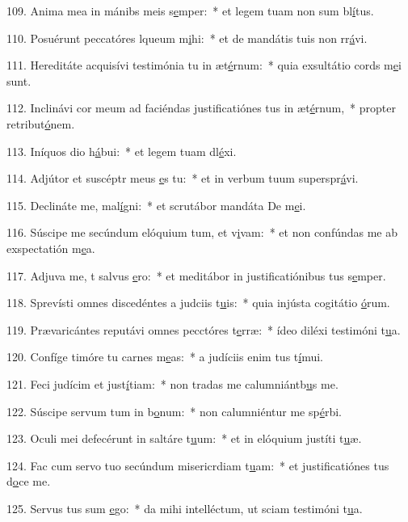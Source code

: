 109. Anima mea in mánibs meis s\uline{e}mper:~* et legem tuam non sum bl\uline{í}tus.\par 
110. Posuérunt peccatóres lqueum m\uline{i}hi:~* et de mandátis tuis non rr\uline{á}vi.\par 
111. Hereditáte acquisívi testimónia tu in æt\uline{é}rnum:~* quia exsultátio cords m\uline{e}i sunt.\par 
112. Inclinávi cor meum ad faciéndas justificatiónes tus in æt\uline{é}rnum,~* propter retribut\uline{ó}nem.\par 
113. Iníquos dio h\uline{á}bui:~* et legem tuam dl\uline{é}xi.\par 
114. Adjútor et suscéptr meus \uline{e}s tu:~* et in verbum tuum superspr\uline{á}vi.\par 
115. Declináte  me, mal\uline{í}gni:~* et scrutábor mandáta De m\uline{e}i.\par 
116. Súscipe me secúndum elóquium tum, et v\uline{i}vam:~* et non confúndas me ab exspectatión m\uline{e}a.\par 
117. Adjuva me, t salvus \uline{e}ro:~* et meditábor in justificatiónibus tus s\uline{e}mper.\par 
118. Sprevísti omnes discedéntes a judciis t\uline{u}is:~* quia injústa cogitátio \uline{ó}rum.\par 
119. Prævaricántes reputávi omnes pecctóres t\uline{e}rræ:~* ídeo diléxi testimóni t\uline{u}a.\par 
120. Confíge timóre tu carnes m\uline{e}as:~* a judíciis enim tus t\uline{í}mui.\par 
121. Feci judícim et just\uline{í}tiam:~* non tradas me calumniántb\uline{u}s me.\par 
122. Súscipe servum tum in b\uline{o}num:~* non calumniéntur me sp\uline{é}rbi.\par 
123. Oculi mei defecérunt in saltáre t\uline{u}um:~* et in elóquium justíti t\uline{u}æ.\par 
124. Fac cum servo tuo secúndum misericrdiam t\uline{u}am:~* et justificatiónes tus d\uline{o}ce me.\par 
125. Servus tus sum \uline{e}go:~* da mihi intelléctum, ut sciam testimóni t\uline{u}a.\par 
